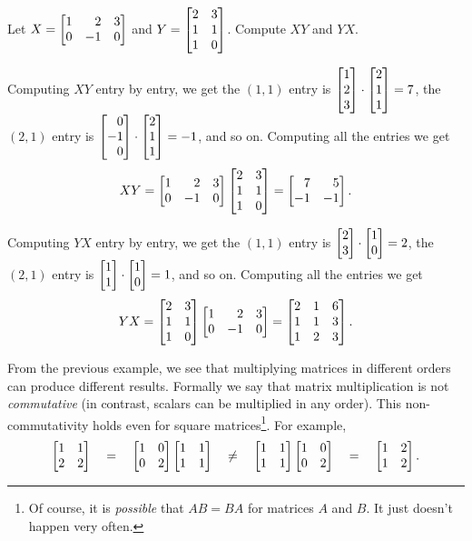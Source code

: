 \begin{example}Let $X=\mat{1&2&3\\0&-1&0}$ and $Y=\mat{2&3\\1&1\\1&0}$. Compute $XY$ and $YX$.

	Computing $XY$ entry by entry, we get the $(1,1)$ entry is $\mat{1\\2\\3}\cdot\mat{2\\1\\1}=7$, the $(2,1)$
	entry is $\mat{0\\-1\\0}\cdot\mat{2\\1\\1}=-1$, and so on. Computing all the entries we get
	\[
		XY=\mat{1&2&3\\0&-1&0}\mat{2&3\\1&1\\1&0}=\mat{7&5\\-1&-1}.
	\]

	Computing $YX$ entry by entry, we get the $(1,1)$ entry is $\mat{2\\3}\cdot\mat{1\\0}=2$, the $(2,1)$
	entry is $\mat{1\\1}\cdot\mat{1\\0}=1$, and so on. Computing all the entries we get
	\[
		YX=\mat{2&3\\1&1\\1&0}\mat{1&2&3\\0&-1&0}=\mat{2&1&6\\1&1&3\\1&2&3}.
	\]
\end{example}

From the previous example, we see that multiplying matrices in different orders can produce
different results. Formally we say that matrix multiplication is not \emph{commutative} (in contrast,
scalars can be multiplied in any order). This non-commutativity holds even for square matrices\footnote{ Of course, it is \emph{possible}
that $AB=BA$ for matrices $A$ and $B$. It just doesn't happen very often.}. For example,
\[
	 \mat{1&1\\2&2}\quad =\quad \mat{1&0\\0&2}\mat{1&1\\1&1}\quad \neq\quad \mat{1&1\\1&1}\mat{1&0\\0&2} \quad=\quad \mat{1&2\\1&2}.
\]

